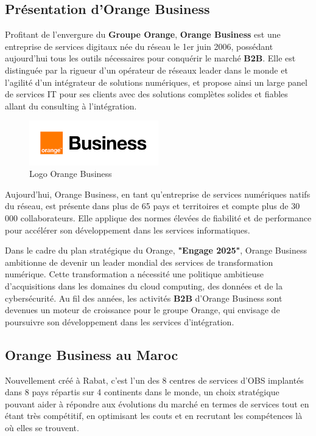 \subsection{Présentation d’Orange Business}

Profitant de l’envergure du \textbf{Groupe Orange}, \textbf{Orange Business} est une entreprise de services digitaux née du réseau le 1er juin 2006, possédant aujourd’hui tous les outils nécessaires pour conquérir le marché \textbf{B2B}. 
Elle est distinguée par la rigueur d’un opérateur de réseaux leader dans le monde et l’agilité d’un intégrateur de solutions numériques, et propose ainsi un large panel de services IT pour ses clients avec des solutions complètes solides et fiables allant du consulting à l’intégration. 

\begin{figure}[h]
    \centering
    \includegraphics[width=0.5\textwidth]{logos/OBS.png}
    \caption{Logo Orange Business}
    \label{fig:orange_logo}
\end{figure}

\clearpage

Aujourd'hui, Orange Business, en tant qu'entreprise de services numériques natifs du réseau, est présente dans plus de 65 pays et territoires et compte plus de 30 000 collaborateurs. Elle applique des normes élevées de fiabilité et de performance pour accélérer son développement dans les services informatiques.

\medskip

Dans le cadre du plan stratégique du Orange, \textbf{"Engage 2025"}, Orange Business ambitionne de devenir un leader mondial des services de transformation numérique.
Cette transformation a nécessité une politique ambitieuse d'acquisitions dans les domaines du cloud computing, des données et de la cybersécurité. Au fil des années, les activités \textbf{B2B} d'Orange Business sont devenues un moteur de croissance pour le groupe Orange, qui envisage de poursuivre son développement dans les services d'intégration.

\subsection{Orange Business au Maroc}
Nouvellement créé à Rabat, c’est l’un des 8 centres de services d’OBS implantés dans 8 pays répartis sur 4 continents
dans le monde, un choix stratégique pouvant aider à répondre aux évolutions du marché en termes de services
tout en étant très compétitif, en optimisant les couts et en recrutant les compétences là où elles se trouvent.


